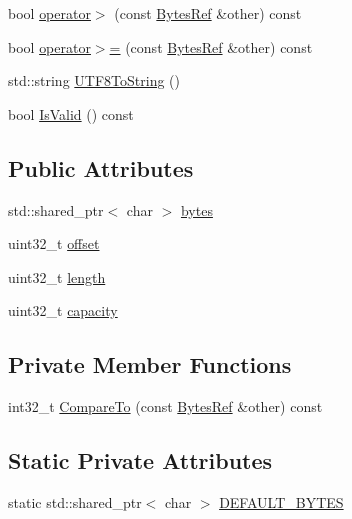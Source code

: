 \begin{DoxyCompactItemize}
\item 
bool \mbox{\hyperlink{classlucene_1_1core_1_1util_1_1BytesRef_a4d526c1de9d527ddc8298117b94ef29d}{operator$>$}} (const \mbox{\hyperlink{classlucene_1_1core_1_1util_1_1BytesRef}{Bytes\+Ref}} \&other) const
\item 
bool \mbox{\hyperlink{classlucene_1_1core_1_1util_1_1BytesRef_a17482ef83c73168704b378a6c2e43e8f}{operator$>$=}} (const \mbox{\hyperlink{classlucene_1_1core_1_1util_1_1BytesRef}{Bytes\+Ref}} \&other) const
\item 
std\+::string \mbox{\hyperlink{classlucene_1_1core_1_1util_1_1BytesRef_ad5cf9964fc7ac5450ee4c38f18f046bb}{U\+T\+F8\+To\+String}} ()
\item 
bool \mbox{\hyperlink{classlucene_1_1core_1_1util_1_1BytesRef_aa1b9faf8ecc8285118b4cc63dd8d7d57}{Is\+Valid}} () const
\end{DoxyCompactItemize}
\subsection*{Public Attributes}
\begin{DoxyCompactItemize}
\item 
std\+::shared\+\_\+ptr$<$ char $>$ \mbox{\hyperlink{classlucene_1_1core_1_1util_1_1BytesRef_a50b260da81b7f31687ac167ff52c9a1c}{bytes}}
\item 
uint32\+\_\+t \mbox{\hyperlink{classlucene_1_1core_1_1util_1_1BytesRef_a00b5e81a37602c7af1fde636cd44f12b}{offset}}
\item 
uint32\+\_\+t \mbox{\hyperlink{classlucene_1_1core_1_1util_1_1BytesRef_a198e62928759942ffc9d2c3ff877b4e4}{length}}
\item 
uint32\+\_\+t \mbox{\hyperlink{classlucene_1_1core_1_1util_1_1BytesRef_a9e1775d26ac1dec137aa57fae87f654c}{capacity}}
\end{DoxyCompactItemize}
\subsection*{Private Member Functions}
\begin{DoxyCompactItemize}
\item 
int32\+\_\+t \mbox{\hyperlink{classlucene_1_1core_1_1util_1_1BytesRef_a028de5040f03a4f1508986699263f952}{Compare\+To}} (const \mbox{\hyperlink{classlucene_1_1core_1_1util_1_1BytesRef}{Bytes\+Ref}} \&other) const
\end{DoxyCompactItemize}
\subsection*{Static Private Attributes}
\begin{DoxyCompactItemize}
\item 
static std\+::shared\+\_\+ptr$<$ char $>$ \mbox{\hyperlink{classlucene_1_1core_1_1util_1_1BytesRef_abcb0c93627877d9d8b01889830e879b0}{D\+E\+F\+A\+U\+L\+T\+\_\+\+B\+Y\+T\+ES}}
\end{DoxyCompactItemize}


